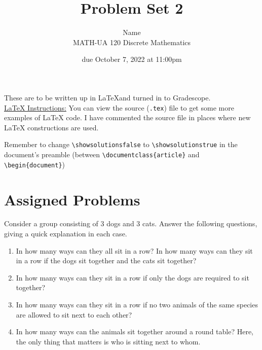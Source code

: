 \documentclass{article}
\title{Problem Set 2}
\author{%
    Name
\\  MATH-UA 120 Discrete Mathematics
}
\date{due October 7, 2022 at 11:00pm}
\newif\ifshowsolutions
\newcommand{\danger}{\marginpar[\hfill\dbend]{\dbend\hfill}}
\theoremstyle{definition}
\begin{document}
\maketitle



These are to be written up in \LaTeX and turned in to Gradescope.\\



\ifshowsolutions
    \SetupExSheets{solution/print=true}
\else
    \danger
 \underline{ \LaTeX{}  Instructions:}  You can view the source (\texttt{.tex}) file to get some more examples of \LaTeX{} code.  I have commented the source file in places where new \LaTeX{} constructions are used.
  
  Remember to change \verb|\showsolutionsfalse| to \verb|\showsolutionstrue|
    in the document's preamble 
    (between \verb|\documentclass{article}| and \verb|\begin{document}|)
\fi

\section*{Assigned Problems}

\begin{question}
Consider a group consisting of 3 dogs and 3 cats. Answer the following questions, giving a quick explanation in each case.

\begin{enumerate}
	\item In how many ways can they all sit in a row? In how many ways can they sit in a row if the dogs sit together and the cats sit together?
	\item In how many ways can they sit in a row if only the dogs are required to sit together?
	\item In how many ways can they sit in a row if no two animals of the same species are allowed to sit next to each other?
	\item In how many ways can the animals sit together around a round table? Here, the only thing that matters is who is sitting next to whom.
\end{enumerate}
\end{question}
\begin{solution}
\end{solution}
\end{document}
